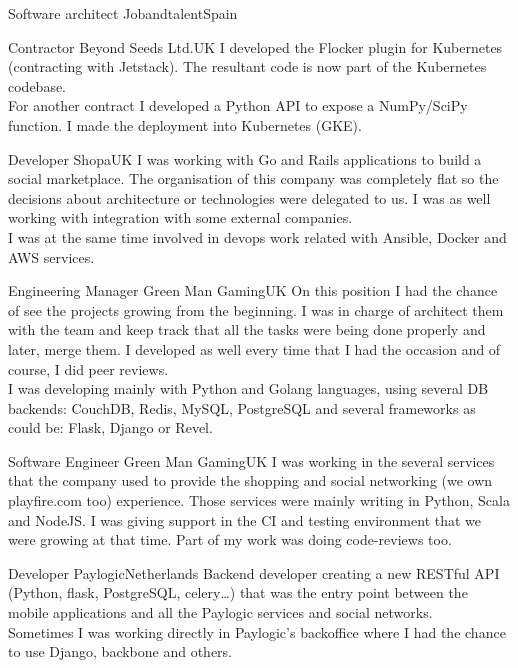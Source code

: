\documentclass[11pt, a4paper, sans]{moderncv}
\begin{document}
\makecvtitle


%
%

{Software architect}
{Jobandtalent}{Spain}{}
{$ $\\}

{Contractor}
{Beyond Seeds Ltd.}{UK}{}
{I developed the Flocker plugin for Kubernetes (contracting with Jetstack). The resultant code is now part of the Kubernetes codebase.\\
For another contract I developed a Python API to expose a NumPy/SciPy function. I made the deployment into Kubernetes (GKE).\\}

{Developer}
{Shopa}{UK}{}
{I was working with Go and Rails applications to build a social marketplace. The
organisation of this company was completely flat so the decisions about
architecture or technologies were delegated to us. I was as well working with
integration with some external companies.\\I was at the same time involved in
devops work related with Ansible, Docker and AWS services.\\}

{Engineering Manager}
{Green Man Gaming}{UK}{}
{On this position I had the chance of see the projects growing from the
beginning. I was in charge of architect them with the team and keep track that
all the tasks were being done properly and later, merge them. I developed  as
well every time that I had the occasion and of course, I did peer reviews.\\I
was developing mainly with Python and Golang languages, using several DB
backends: CouchDB, Redis, MySQL, PostgreSQL and several frameworks as could be:
Flask, Django or Revel.\\}

{Software Engineer}
{Green Man Gaming}{UK}{}
{I was working in the several services that the company used to provide the
shopping and social networking (we own playfire.com too) experience. Those
services were mainly writing in Python, Scala and NodeJS. I was giving support
in the CI and testing environment that we were growing at that time. Part of my
work was doing code-reviews too.\\}

{Developer}
{Paylogic}{Netherlands}{}
{Backend developer creating a new RESTful API (Python, flask, PostgreSQL,
celery\ldots) that was the entry point between the mobile applications and all
the Paylogic services and social networks.\\Sometimes I was working directly in
Paylogic's backoffice where I had the chance to use Django, backbone and others.\\}
\end{document}
